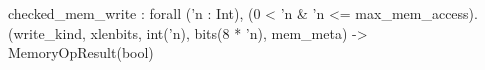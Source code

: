 checked_mem_write : forall ('n : Int), (0 < 'n & 'n <= max_mem_access).
  (write_kind, xlenbits, int('n), bits(8 * 'n), mem_meta) -> MemoryOpResult(bool)